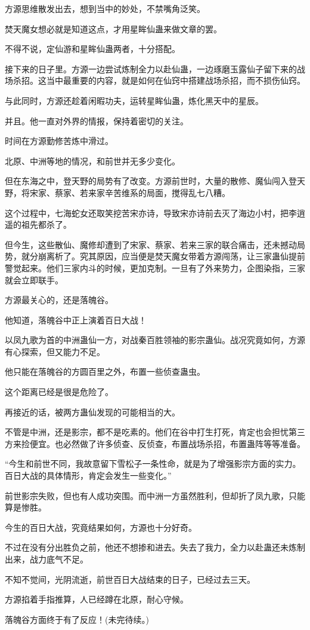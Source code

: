 \begin{this_body}
方源思维散发出去，想到当中的妙处，不禁嘴角泛笑。

焚天魔女想必就是知道这点，才用星眸仙蛊来做文章的罢。

不得不说，定仙游和星眸仙蛊两者，十分搭配。

接下来的日子里。方源一边尝试炼制全力以赴仙蛊，一边琢磨玉露仙子留下来的战场杀招。这当中最重要的内容，就是如何在仙窍中搭建战场杀招，而不损伤仙窍。

与此同时，方源还趁着闲暇功夫，运转星眸仙蛊，炼化黑天中的星辰。

并且。他一直对外界的情报，保持着密切的关注。

时间在方源勤修苦炼中滑过。

北原、中洲等地的情况，和前世并无多少变化。

但在东海之中，登天野的局势有了改变。方源前世时，大量的散修、魔仙闯入登天野，将宋家、蔡家、若来家辛苦维系的局面，搅得乱七八糟。

这个过程中，七海蛇女还取笑挖苦宋亦诗，导致宋亦诗前去灭了海边小村，把李逍遥的祖先都杀了。

但今生，这些散仙、魔修却遭到了宋家、蔡家、若来三家的联合痛击，还未撼动局势，就分崩离析了。究其原因，应当便是焚天魔女带着方源闯荡，让三家蛊仙提前警觉起来。他们三家内斗的时候，更加克制。一旦有了外来势力，企图染指，三家就会立即联手。

方源最关心的，还是落魄谷。

他知道，落魄谷中正上演着百日大战！

以凤九歌为首的中洲蛊仙一方，对战秦百胜领袖的影宗蛊仙。战况究竟如何，方源有心探索，但又能力不足。

他只能在落魄谷的方圆百里之外，布置一些侦查蛊虫。

这个距离已经是很是危险了。

再接近的话，被两方蛊仙发现的可能相当的大。

不管是中洲，还是影宗，都不是吃素的。他们在谷中打生打死，肯定也会担忧第三方来捡便宜。也必然做了许多侦查、反侦查，布置战场杀招，布置蛊阵等等准备。

“今生和前世不同，我故意留下雪松子一条性命，就是为了增强影宗方面的实力。百日大战的具体情形，肯定会发生一些变化。”

前世影宗失败，但也有人成功突围。而中洲一方虽然胜利，但却折了凤九歌，只能算是惨胜。

今生的百日大战，究竟结果如何，方源也十分好奇。

不过在没有分出胜负之前，他还不想掺和进去。失去了我力，全力以赴蛊还未炼制出来，战力底气不足。

不知不觉间，光阴流逝，前世百日大战结束的日子，已经过去三天。

方源掐着手指推算，人已经蹲在北原，耐心守候。

落魄谷方面终于有了反应！(未完待续。)

\end{this_body}

